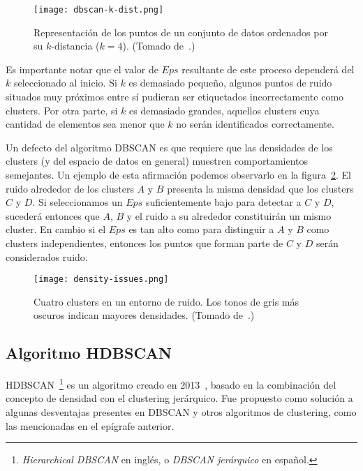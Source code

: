 \begin{figure}[!h]
    \centering
    \texttt{[image: dbscan-k-dist.png]}
    \caption{Representación de los puntos de un conjunto de datos ordenados por su $k$-distancia ($k=4$). (Tomado de~\cite{Tan05}.)}
    \label{img:dbscan-k-dist}
\end{figure}

Es importante notar que el valor de $Eps$ resultante de este proceso dependerá del $k$ seleccionado al inicio.
Si $k$ es demasiado pequeño, algunos puntos de ruido situados muy próximos entre sí pudieran ser etiquetados incorrectamente como clusters.
Por otra parte, si $k$ es demasiado grandes, aquellos clusters cuya cantidad de elementos sea menor que $k$ no serán identificados correctamente.

Un defecto del algoritmo DBSCAN es que requiere que las densidades de los clusters (y del espacio de datos en general) muestren comportamientos semejantes.
Un ejemplo de esta afirmación podemos observarlo en la figura~\ref{img:density-issues}.
El ruido alrededor de los clusters $A$ y $B$ presenta la misma densidad que los clusters $C$ y $D$.
Si seleccionamos un $Eps$ suficientemente bajo para detectar a $C$ y $D$, sucederá entonces que $A$, $B$ y el ruido a su alrededor constituirán un mismo cluster.
En cambio si el $Eps$ es tan alto como para distinguir a $A$ y $B$ como clusters independientes, entonces los puntos que forman parte de $C$ y $D$ serán considerados ruido.

\begin{figure}[!h]
    \centering
    \texttt{[image: density-issues.png]}
    \caption{Cuatro clusters en un entorno de ruido.
    Los tonos de gris más oscuros indican mayores densidades. (Tomado de~\cite{Tan05}.)}
    \label{img:density-issues}
\end{figure}

\subsection{Algoritmo HDBSCAN}\label{subsec:HDBSCAN}

HDBSCAN~\footnote{\textit{Hierarchical DBSCAN} en inglés, o \textit{DBSCAN jerárquico} en español.} es un algoritmo creado en 2013~\cite{Campello13}, basado en la combinación del concepto de densidad con el clustering jerárquico.
Fue propuesto como solución a algunas desventajas presentes en DBSCAN y otros algoritmos de clustering, como las mencionadas en el epígrafe anterior.

